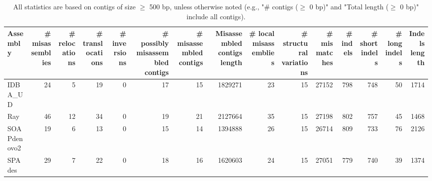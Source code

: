 \documentclass[12pt,a4paper]{article}
\begin{document}
\begin{table}[ht]
\begin{center}
\caption{All statistics are based on contigs of size $\geq$ 500 bp, unless otherwise noted (e.g., "\# contigs ($\geq$ 0 bp)" and "Total length ($\geq$ 0 bp)" include all contigs).}
\begin{tabular}{|l*{14}{|r}|}
\hline
Assembly & \# misassemblies &     \# relocations &     \# translocations &     \# inversions & \# possibly misassembled contigs & \# misassembled contigs & Misassembled contigs length & \# local misassemblies & \# structural variations & \# mismatches & \# indels &     \# short indels &     \# long indels & Indels length \\ \hline
IDBA\_UD & 24 & 5 & 19 & 0 & 17 & 15 & 1829271 & 23 & 15 & 27152 & 798 & 748 & 50 & 1714 \\ \hline
Ray & 46 & 12 & 34 & 0 & 19 & 21 & 2127664 & 35 & 15 & 27198 & 802 & 757 & 45 & 1468 \\ \hline
SOAPdenovo2 & 19 & 6 & 13 & 0 & 15 & 14 & 1394888 & 26 & 15 & 26714 & 809 & 733 & 76 & 2126 \\ \hline
SPAdes & 29 & 7 & 22 & 0 & 18 & 16 & 1620603 & 24 & 15 & 27051 & 779 & 740 & 39 & 1374 \\ \hline
\end{tabular}
\end{center}
\end{table}
\end{document}
